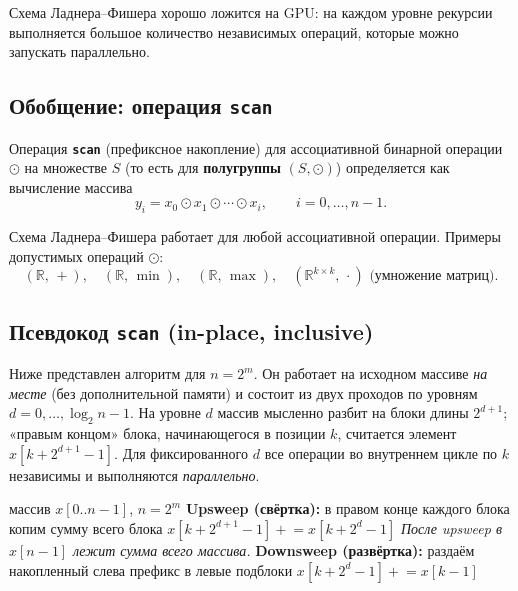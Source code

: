\begin{Remark}{}{}
	Схема Ладнера–Фишера хорошо ложится на GPU: на каждом уровне рекурсии выполняется большое количество независимых операций, которые можно запускать параллельно.
\end{Remark}

\subsection{Обобщение: операция \texttt{scan}}

\begin{Definition}{}{}
	Операция \textbf{\texttt{scan}} (префиксное накопление) для ассоциативной бинарной операции $\odot$ на множестве $S$ (то есть для \textbf{полугруппы} $(S, \odot)$) определяется как вычисление массива
	\[
	y_i = x_0 \odot x_1 \odot \cdots \odot x_i, \qquad i = 0, \dots, n-1.
	\]
\end{Definition}

Схема Ладнера–Фишера работает для любой ассоциативной операции. Примеры допустимых операций $\odot$:
\[
(\mathbb{R},\, +), \quad
(\mathbb{R},\, \min), \quad
(\mathbb{R},\, \max), \quad
(\mathbb{R}^{k \times k},\, \cdot) \text{ (умножение матриц)}.
\]

\subsection{Псевдокод \texttt{scan} (in-place, inclusive)}

Ниже представлен алгоритм для $n = 2^m$. Он работает на исходном массиве \emph{на месте} (без дополнительной памяти) и состоит из двух проходов по уровням $d = 0, \dots, \log_2 n - 1$. На уровне $d$ массив мысленно разбит на блоки длины $2^{d+1}$; «правым концом» блока, начинающегося в позиции $k$, считается элемент $x[k + 2^{d+1} - 1]$. Для фиксированного $d$ все операции во внутреннем цикле по $k$ независимы и выполняются \emph{параллельно}.

\begin{algorithm}[H]
	\caption{\texttt{scan} (in-place, inclusive)}
	\begin{algorithmic}[1]
		\Require массив $x[0..n-1]$, $n = 2^m$
		\Statex \textbf{Upsweep (свёртка):} в правом конце каждого блока копим сумму всего блока
		\State $x[k + 2^{d+1} - 1] \mathrel{+}= x[k + 2^d - 1]$ 
		\EndFor
		\EndFor
		\Statex \emph{После upsweep в } $x[n-1]$ \emph{ лежит сумма всего массива.}
		\Statex \textbf{Downsweep (развёртка):} раздаём накопленный слева префикс в левые подблоки
		 
		\State $x[k + 2^d - 1] \mathrel{+}= x[k - 1]$ 
		\EndIf
		\EndFor
		\EndFor
	\end{algorithmic}
\end{algorithm}

